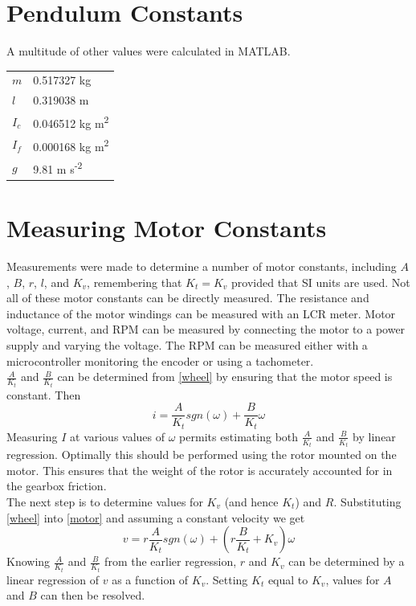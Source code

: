 \documentclass[12pt,letterpaper]{article}
\begin{document}
\begin{appendices}
\section{Pendulum Constants}
A multitude of other values were calculated in MATLAB.  \\

\begin{tabular}{l l}
$m$ & 0.517327 kg \\
$l$ & 0.319038 m \\
$I_{c}$ & 0.046512 kg m\textsuperscript{2} \\
$I_{f}$ & 0.000168 kg m\textsuperscript{2} \\
$g$ & 9.81 m s\textsuperscript{-2} \\
\end{tabular}




\section{Measuring Motor Constants}
\label{appendix:measure}
Measurements were made to determine a number of motor constants, including $A$, $B$, $r$, $l$, and $K_{v}$, remembering that $K_{t} = K_{v}$ provided that SI units are used.  Not all of these motor constants can be directly measured.  The resistance and inductance of the motor windings can be measured with an LCR meter.
Motor voltage, current, and RPM can be measured by connecting the motor to a power supply and varying the voltage.  The RPM can be measured either with a microcontroller monitoring the encoder or using a tachometer.\\

$\frac{A}{K_{t}}$ and $\frac{B}{K_{t}}$ can be determined from \eqref{wheel} by ensuring that the motor speed is constant.  Then
\begin{equation}
    i = \frac{A}{K_{t}}sgn(\omega) + \frac{B}{K_{t}} \omega
\end{equation}
Measuring $I$ at various values of $\omega$ permits estimating both $\frac{A}{K_{t}}$ and $\frac{B}{K_{t}}$ by linear
regression.  Optimally this should be performed using the rotor mounted on the motor. This ensures that
the weight of the rotor is accurately accounted for in the gearbox friction.\\

The next step is to determine values for $K_{v}$ (and hence $K_{t}$) and $R$.  Substituting \eqref{wheel} into \eqref{motor} and assuming a constant velocity we get
\begin{equation}
    v = r\frac{A}{K_{t}}sgn(\omega) + (r\frac{B}{K_{t}}+K_{v}) \omega
\end{equation}
Knowing $\frac{A}{K_{t}}$ and $\frac{B}{K_{t}}$ from the earlier regression, $r$ and $K_{v}$ can be determined by a linear regression of $v$ as a function of $K_{v}$.  Setting $K_{t}$ equal to $K_{v}$, values for $A$ and $B$ can then be resolved.\\


\end{appendices}
\end{document}
